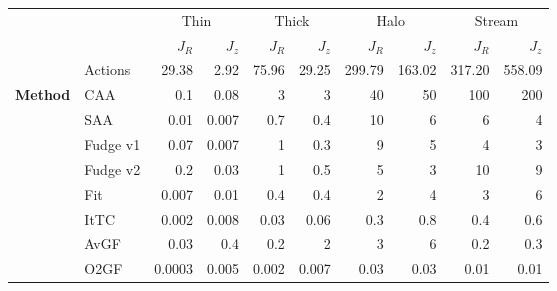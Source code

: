 \begin{tabular}{llrrrrrrrr}
&&\multicolumn{2}{c}{Thin}&\multicolumn{2}{c}{Thick}&\multicolumn{2}{c}{Halo}&\multicolumn{2}{c}{Stream}\\
&&$J_R$&$J_z$&$J_R$&$J_z$&$J_R$&$J_z$&$J_R$&$J_z$\\
\hline
 &Actions & 29.38 & 2.92 & 75.96 & 29.25 & 299.79 &  163.02 & 317.20 &   558.09 \\
\hline
\hline
 \textbf{Method}&CAA      & 0.1   & 0.08  & 3   & 3   & 40 & 50 & 100 & 200 \\
 &SAA      & 0.01  & 0.007 & 0.7 & 0.4 & 10 & 6     & 6     & 4     \\
 &Fudge v1 & 0.07  & 0.007 & 1   & 0.3 & 9     & 5     & 4     & 3     \\
 &Fudge v2 & 0.2   & 0.03  & 1   & 0.5 & 5     & 3     & 10 & 9     \\
 &Fit      & 0.007 & 0.01  & 0.4 & 0.4 & 2     & 4     & 3     & 6     \\
\hline
 &ItTC   & 0.002  & 0.008 & 0.03  & 0.06  & 0.3  & 0.8  & 0.4  & 0.6  \\
 &AvGF & 0.03   & 0.4   & 0.2   & 2     & 3    & 6    & 0.2  & 0.3  \\
 &O2GF   & 0.0003 & 0.005 & 0.002 & 0.007 & 0.03 & 0.03 & 0.01 & 0.01 \\
\hline
\end{tabular}
